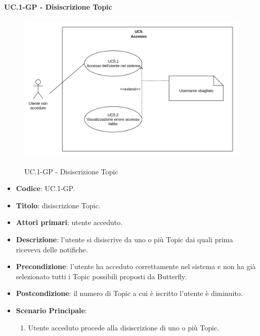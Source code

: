 	\paragraph{UC\theuccount.1-GP - Disiscrizione Topic}
		\begin{figure}[H]
			\centering
			\includegraphics[width=\columnwidth]{img/UC5.png}\\
			\caption{UC\theuccount.1-GP - Disiscrizione Topic}
		\end{figure}
		\begin{itemize}
			\item \textbf{Codice}: UC\theuccount.1-GP.
			\item \textbf{Titolo}: disiscrizione Topic.
			\item \textbf{Attori primari}: utente acceduto.
			\item \textbf{Descrizione}: l’utente si disiscrive da uno o più Topic dai quali prima riceveva
			delle notifiche.
			\item \textbf{Precondizione}: l’utente ha acceduto correttamente nel sistema e non ha già
			selezionato tutti i Topic possibili proposti da Butterfly.
			\item \textbf{Postcondizione}: il numero di Topic a cui è iscritto l’utente è diminuito.
			\item \textbf{Scenario Principale}:
			\begin{enumerate}
				\item Utente acceduto procede alla disiscrizione di uno o più Topic.
			\end{enumerate}
		\end{itemize}
		
